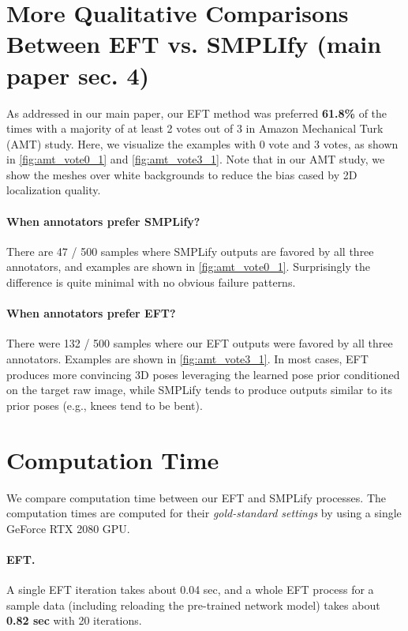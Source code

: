 \documentclass[10pt,twocolumn,letterpaper]{article}
\begin{document}
	
	\section{More Qualitative Comparisons Between EFT vs. SMPLIfy (main paper sec. 4)}
	As addressed in our main paper, our EFT method was preferred \textbf{61.8\%} of the times with a majority of at least 2 votes out of 3 in Amazon Mechanical Turk (AMT) study. Here, we visualize the examples with 0 vote and 3 votes, as shown in \cref{fig:amt_vote0_1} and \ref{fig:amt_vote3_1}. Note that in our AMT study, we show the meshes over white backgrounds to reduce the bias cased by 2D localization quality. 
	
	\paragraph{When annotators prefer SMPLify?}
	There are 47 / 500 samples where SMPLify outputs are favored by all three annotators, and examples are shown in \cref{fig:amt_vote0_1}. Surprisingly the difference is quite minimal with no obvious failure patterns. 
	
	\paragraph{When annotators prefer EFT?}
	There were 132 / 500 samples where our EFT outputs were favored by all three annotators. Examples are shown in \cref{fig:amt_vote3_1}. In most cases, EFT produces more convincing 3D poses  leveraging the learned pose prior conditioned on the target raw image, while SMPLify tends to produce outputs similar to its prior poses (e.g., knees tend to be bent).
	
	
	
	\section{Computation Time}
	We compare computation time between our EFT and SMPLify processes. The computation times are computed for their \emph{gold-standard settings} by using a single GeForce RTX 2080 GPU. 
	
	\paragraph{EFT.}
	A single EFT iteration takes about 0.04 sec, and a whole EFT process for a sample data (including reloading the pre-trained network model) takes about \textbf{0.82 sec} with 20 iterations.
	
\end{document}
